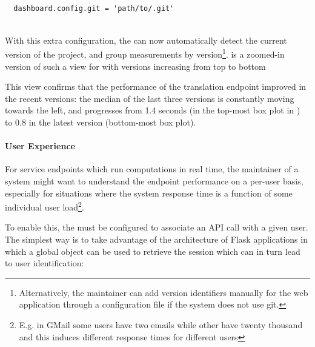 \documentclass{sig-alternate-05-2015}
\begin{document}
    \begin{lstlisting}[style=custompython]
  
  dashboard.config.git = 'path/to/.git'
    
  \end{lstlisting}  
 
  With this extra configuration, the \tool can now automatically detect the current version of the project, and group measurements by version\footnote{Alternatively, the maintainer can add version identifiers manually for the web application through a configuration file if the system does not use git.}.  is a zoomed-in version of such a view for \epTranslations with versions increasing from top to bottom
  
  

  This view confirms that the performance of the translation endpoint improved in the recent versions: the median of the last three versions is constantly moving towards the left, and progresses from 1.4 seconds (in the top-most box plot in ) to 0.8 in the latest version (bottom-most box plot).
  

\paragraph{User Experience}
\label{sec:user}

For service endpoints which run computations in real time, the maintainer of a system might want to understand the endpoint performance on a per-user basis, especially for situations where the system response time is a function of some individual user load\footnote{E.g. in GMail some users have two emails while other have twenty thousand and this induces different response times for different users}.


To enable this, the \tool must be configured to associate an API call with a given user. The simplest way is to take advantage of the architecture of Flask applications in which a global  object can be used to retrieve the session which can in turn lead to user identification: 
\end{document}
